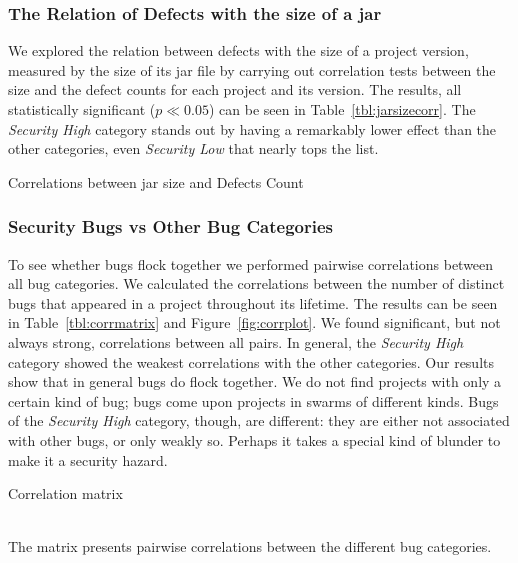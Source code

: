 \documentclass[conference]{llncs}
\begin{document}
\subsubsection{The Relation of Defects with the size of a {\sc jar}}

We explored the relation between defects with the size of a project version,
measured by the size of its {\sc jar} file by carrying out correlation tests
between the size and the defect counts for each project and its
version. The results, all statistically significant ($p \ll
0.05$) can be seen in Table~\ref{tbl:jarsizecorr}. The {\it Security
  High} category stands out by having a remarkably lower effect than
the other categories, even {\it Security Low} that nearly tops the
list.

\begin{table}
    \centering
    \caption{Correlations between jar size and Defects Count}
    \label{tbl:jarsizecorr}
    
\end{table}

\subsubsection{Security Bugs {\sc vs} Other Bug Categories}

To see whether bugs flock together we performed pairwise correlations
between all bug categories. We calculated the correlations between the
number of distinct bugs that appeared in a project throughout its
lifetime. The results can be seen in Table~\ref{tbl:corrmatrix} and
Figure~\ref{fig:corrplot}. We found significant, but not always
strong, correlations between all pairs. In general, the {\it Security
  High} category showed the weakest correlations with the other
categories. Our results show that in general bugs do flock together.
We do not find projects with only a certain kind of bug; bugs come
upon projects in swarms of different kinds. Bugs of the {\it Security
  High} category, though, are different: they are either not
associated with other bugs, or only weakly so. Perhaps it takes a
special kind of blunder to make it a security hazard.

\begin{table}
    \centering
    \caption{Correlation matrix}
    \label{tbl:corrmatrix}
    
    \\
    \small The matrix presents pairwise correlations between the
        different bug categories.
\end{table}
\end{document}
